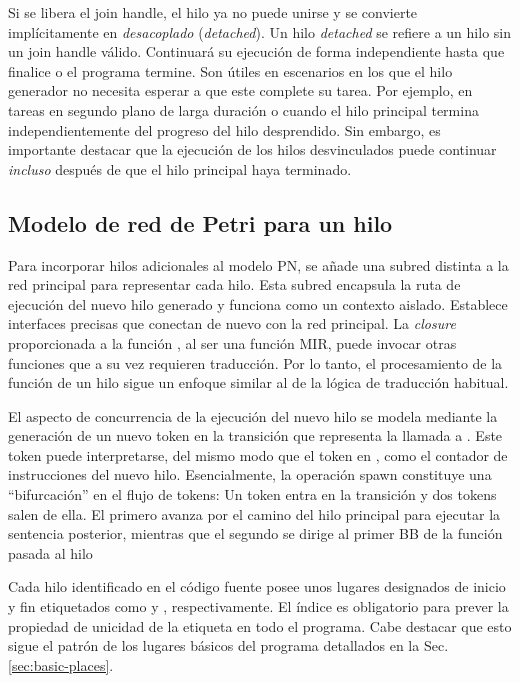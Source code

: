 Si se libera el join handle, el hilo ya no puede unirse y se convierte implícitamente en
\emph{desacoplado} (\emph{detached}).
Un hilo \emph{detached} se refiere a un hilo sin un join handle válido.
Continuará su ejecución de forma independiente hasta que finalice o el programa termine.
Son útiles en escenarios en los que el hilo generador no necesita esperar a que este complete su tarea.
Por ejemplo, en tareas en segundo plano de larga duración o cuando el hilo principal termina
independientemente del progreso del hilo desprendido. Sin embargo, es importante destacar
que la ejecución de los hilos desvinculados puede continuar \emph{incluso} después de que el hilo
principal haya terminado.

\subsection{Modelo de red de Petri para un hilo}

Para incorporar hilos adicionales al modelo \acrshort{PN}, se añade una subred distinta a la red principal
para representar cada hilo. Esta subred encapsula la ruta de ejecución del nuevo hilo generado y
funciona como un contexto aislado. Establece interfaces precisas que conectan de nuevo con la
red principal. La \emph{closure} proporcionada a la función , al ser una función MIR, puede
invocar otras funciones que a su vez requieren traducción. Por lo tanto, el procesamiento de la
función de un hilo sigue un enfoque similar al de la lógica de traducción habitual.

El aspecto de concurrencia de la ejecución del nuevo hilo se modela mediante la generación de
un nuevo token en la transición que representa la llamada a . Este token puede
interpretarse, del mismo modo que el token en , como el contador de
instrucciones del nuevo hilo. Esencialmente, la operación spawn constituye una ``bifurcación''
en el flujo de tokens: Un token entra en la transición y dos tokens salen de ella. El primero
avanza por el camino del hilo principal para ejecutar la sentencia posterior, mientras que el
segundo se dirige al primer \acrshort{BB} de la función pasada al hilo

Cada hilo identificado en el código fuente posee unos lugares designados de inicio y fin
etiquetados como  y , respectivamente. El índice
es obligatorio para prever la propiedad de unicidad de la etiqueta en todo el programa. Cabe
destacar que esto sigue el patrón de los lugares básicos del programa detallados en la Sec. \ref{sec:basic-places}.

